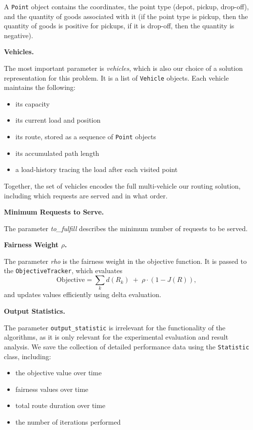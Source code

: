 \documentclass[12pt]{article}
\begin{document}
A \texttt{Point} object contains the coordinates, the point type (depot, pickup, drop-off),
and the quantity of goods associated with it (if the point type is pickup, then  the quantity of goods is positive for pickups, if it is drop-off, then the quantity is negative).

\vspace{0.6em}
\textbf{Vehicles.}

The most important parameter is \emph{vehicles}, which is also our choice of a solution representation for this problem. It is a list of \texttt{Vehicle} objects.
Each vehicle maintains the following:
\begin{itemize}
    \item its capacity
    \item its current load and position
    \item its route, stored as a sequence of \texttt{Point} objects
    \item its accumulated path length
    \item a load-history tracing the load after each visited point
\end{itemize}
Together, the set of vehicles encodes the full multi-vehicle our routing solution, including which requests are served and in what order.

\vspace{0.6em}
\textbf{Minimum Requests to Serve.}

The parameter \emph{to\_fulfill} describes the minimum number of requests to
be served.

\vspace{0.6em}
\textbf{Fairness Weight \boldmath$\rho$.}

The parameter \emph{rho} is the fairness weight in the objective function.
It is passed to the \texttt{ObjectiveTracker}, which evaluates
\[
\text{Objective}
=
\sum_{k} d(R_k)
\;+\;
\rho \cdot (1 - J(R)),
\]
and updates values efficiently using delta evaluation.

\vspace{0.6em}
\textbf{Output Statistics.}

The parameter \texttt{output\_statistic} is irrelevant for the functionality of the algorithms, as it is only relevant for the experimental evaluation and result analysis. We save the collection of detailed performance data using the \texttt{Statistic} class,
including:
\begin{itemize}
    \item the objective value over time
    \item fairness values over time
    \item total route duration over time
    \item the number of iterations performed
\end{itemize}
\end{document}
